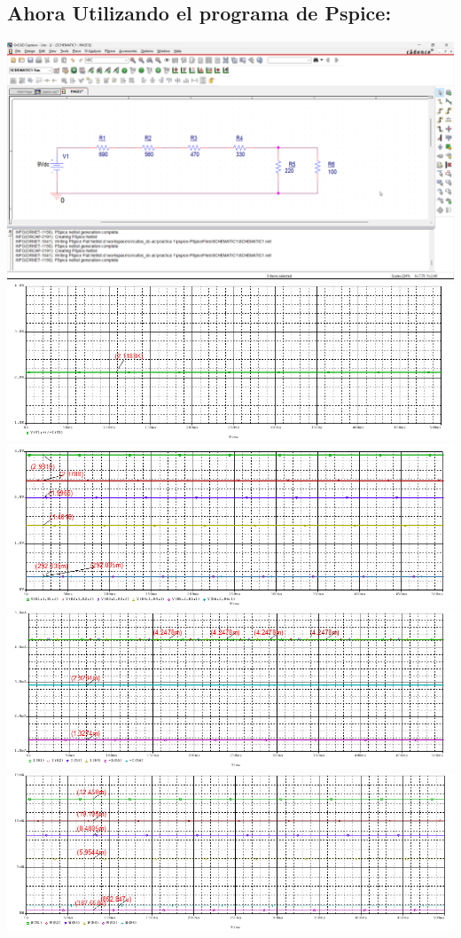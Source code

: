 \documentclass[10pt]{article}
\begin{document}
\begin{multicols}{2}
\subsection{Ahora Utilizando el programa de Pspice:}
\includegraphics[width=\linewidth]{Imagenes/psipce.png}
\includegraphics[width=\linewidth]{Imagenes/reseq.png}
\includegraphics[width=\linewidth]{Imagenes/vk.png}
\includegraphics[width=\linewidth]{Imagenes/intensidad.png}
\includegraphics[width=\linewidth]{Imagenes/potenciak.png}


\end{multicols}
\end{document}
